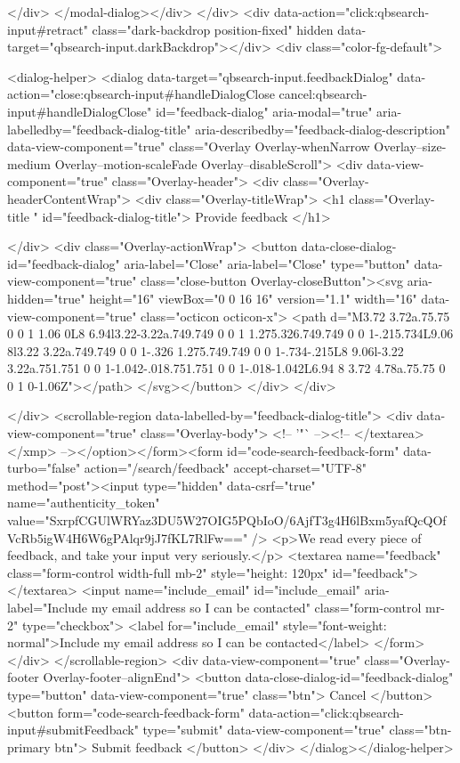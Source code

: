     </div>
</modal-dialog></div>
  </div>
  <div data-action="click:qbsearch-input#retract" class="dark-backdrop position-fixed" hidden data-target="qbsearch-input.darkBackdrop"></div>
  <div class="color-fg-default">
    
<dialog-helper>
  <dialog data-target="qbsearch-input.feedbackDialog" data-action="close:qbsearch-input#handleDialogClose cancel:qbsearch-input#handleDialogClose" id="feedback-dialog" aria-modal="true" aria-labelledby="feedback-dialog-title" aria-describedby="feedback-dialog-description" data-view-component="true" class="Overlay Overlay-whenNarrow Overlay--size-medium Overlay--motion-scaleFade Overlay--disableScroll">
    <div data-view-component="true" class="Overlay-header">
  <div class="Overlay-headerContentWrap">
    <div class="Overlay-titleWrap">
      <h1 class="Overlay-title " id="feedback-dialog-title">
        Provide feedback
      </h1>
        
    </div>
    <div class="Overlay-actionWrap">
      <button data-close-dialog-id="feedback-dialog" aria-label="Close" aria-label="Close" type="button" data-view-component="true" class="close-button Overlay-closeButton"><svg aria-hidden="true" height="16" viewBox="0 0 16 16" version="1.1" width="16" data-view-component="true" class="octicon octicon-x">
    <path d="M3.72 3.72a.75.75 0 0 1 1.06 0L8 6.94l3.22-3.22a.749.749 0 0 1 1.275.326.749.749 0 0 1-.215.734L9.06 8l3.22 3.22a.749.749 0 0 1-.326 1.275.749.749 0 0 1-.734-.215L8 9.06l-3.22 3.22a.751.751 0 0 1-1.042-.018.751.751 0 0 1-.018-1.042L6.94 8 3.72 4.78a.75.75 0 0 1 0-1.06Z"></path>
</svg></button>
    </div>
  </div>
  
</div>
      <scrollable-region data-labelled-by="feedback-dialog-title">
        <div data-view-component="true" class="Overlay-body">        <!-- '"` --><!-- </textarea></xmp> --></option></form><form id="code-search-feedback-form" data-turbo="false" action="/search/feedback" accept-charset="UTF-8" method="post"><input type="hidden" data-csrf="true" name="authenticity_token" value="SxrpfCGUlWRYaz3DU5W27OIG5PQbIoO/6AjfT3g4H6lBxm5yafQcQOfVcRb5igW4H6W6gPAlqr9jJ7fKL7RlFw==" />
          <p>We read every piece of feedback, and take your input very seriously.</p>
          <textarea name="feedback" class="form-control width-full mb-2" style="height: 120px" id="feedback"></textarea>
          <input name="include_email" id="include_email" aria-label="Include my email address so I can be contacted" class="form-control mr-2" type="checkbox">
          <label for="include_email" style="font-weight: normal">Include my email address so I can be contacted</label>
</form></div>
      </scrollable-region>
      <div data-view-component="true" class="Overlay-footer Overlay-footer--alignEnd">          <button data-close-dialog-id="feedback-dialog" type="button" data-view-component="true" class="btn">    Cancel
</button>
          <button form="code-search-feedback-form" data-action="click:qbsearch-input#submitFeedback" type="submit" data-view-component="true" class="btn-primary btn">    Submit feedback
</button>
</div>
</dialog></dialog-helper>

